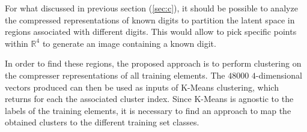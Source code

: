 \documentclass[12pt]{article}
\begin{document}
For what discussed in previous section (\ref{sec:c}), it should be possible to analyze the compressed representations of known digits to partition the latent space in regions associated with different digits.
This would allow to pick specific points within $\mathbb{R}^4$ to generate an image containing a known digit.

In order to find these regions, the proposed approach is to perform clustering on the compresser representations of all training elements.
The $48000$ $4$-dimensional vectors produced can then be used as inputs of K-Means clustering, which returns for each the associated cluster index.
Since K-Means is agnostic to the labels of the training elements, it is necessary to find an approach to map the obtained clusters to the different training set classes.
\end{document}
